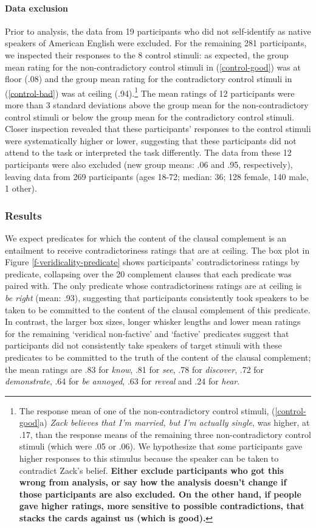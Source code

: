 \documentclass[11pt,fleqn]{article}
\newcommand{\6}{\mbox{$[\hspace*{-.6mm}[$}}
\newcommand{\9}{\mbox{$]\hspace*{-.6mm}]$}}
\begin{document}
{\paragraph{Data exclusion}
Prior to analysis, the data from 19 participants who did not self-identify as native speakers of American English were excluded. For the remaining 281 participants, we inspected their responses to the 8 control stimuli: as expected, the group mean rating for the non-contradictory control stimuli in (\ref{control-good}) was at floor (.08) and the group mean rating for the contradictory control stimuli in (\ref{control-bad}) was at ceiling (.94).\footnote{The response mean of one of the non-contradictory control stimuli, (\ref{control-good}a) {\em Zack believes that I'm married, but I'm actually single}, was higher, at .17, than the response means of the remaining three non-contradictory control stimuli (which were .05 or .06). We hypothesize that some participants gave higher responses to this stimulus because the speaker can be taken to contradict Zack's belief. {\bf Either exclude participants who got this wrong from analysis, or say how the analysis doesn't change if those participants are also excluded. On the other hand, if people gave higher ratings, more sensitive to possible contradictions, that stacks the cards against us (which is good).}}  The mean ratings of 12 participants were more than 3 standard deviations above the group mean for the non-contradictory control stimuli or below the group mean for the contradictory control stimuli. Closer inspection revealed that these participants' responses to the control stimuli were systematically higher or lower, suggesting that these participants did not attend to the task or interpreted the task differently. The data from these 12 participants were also excluded (new group means: .06 and .95, respectively), leaving data from 269 participants (ages 18-72; median: 36; 128 female, 140 male, 1 other).  

\subsubsection{Results}

We expect predicates for which the content of the clausal complement is an entailment to receive contradictoriness ratings that are at ceiling. The box plot in Figure \ref{f-veridicality-predicate} shows participants' contradictoriness ratings by predicate, collapsing over the 20 complement clauses that each predicate was paired with. The only predicate whose contradictoriness ratings are at ceiling is {\em be right} (mean: .93), suggesting that participants consistently took speakers to be taken to be committed to the content of the clausal complement of this predicate. In contrast, the larger box sizes, longer whisker lengths and lower mean ratings for the remaining `veridical non-factive' and `factive' predicates suggest that participants did not consistently take speakers of target stimuli with these predicates to be committed to the truth of the content of the clausal complement; the mean ratings are .83 for {\em know}, .81 for {\em see}, .78 for {\em discover}, .72 for {\em demonstrate}, .64 for {\em be annoyed}, .63 for {\em reveal} and .24 for {\em hear}. 

}
\end{document}
